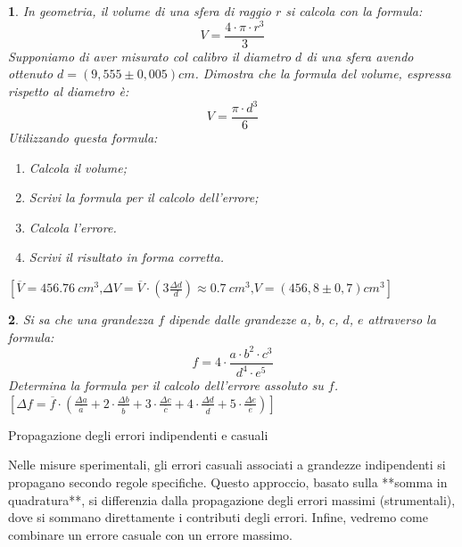 \documentclass[12pt,a4paper,oneside]{book}
\makeatletter
\renewcommand{\section}{\@startsection{section}{1}{\z@}
{-4ex \@plus -1ex \@minus -.4ex}
{1ex \@plus.2ex }
{\normalfont\large\sffamily\bfseries}}
\theoremstyle{esercizio}
\newtheorem{esercizio}{}
\makeatother
\begin{document}
\begin{esercizio}
In geometria, il volume di una sfera di raggio $r$ si calcola con la formula:
\[
V=\frac{4\cdot\pi \cdot r^3}{3}
\] 
Supponiamo di aver misurato col calibro il diametro $d$ di una sfera avendo ottenuto $d=\left(9,555 \pm 0,005\right)\si{cm}$. Dimostra che la formula del volume, espressa rispetto al diametro è:
\[
V=\frac{\pi \cdot d^3}{6}
\]
Utilizzando questa formula:
\begin{enumerate}
\item[a)] Calcola il volume;
\item[b)] Scrivi la formula per il calcolo dell'errore;
\item[c)] Calcola l'errore.
\item[d)] Scrivi il risultato in forma corretta.
\end{enumerate}
 \hspace*{\fill}   $\left[\overline{V}=\SI{456.76}{cm^3}\text{,} \Delta V=\overline{V}\cdot\left(3\frac{\Delta d}{d}\right)\approx\SI{0.7}{cm^3}\text{,} V=\left(456,8 \pm 0,7 \right)\si{cm^3}\right] $
\end{esercizio}
\vspace{0.2cm}
\begin{esercizio}
Si sa che una grandezza $f$ dipende dalle grandezze $a$, $b$, $c$, $d$, $e$ attraverso la formula:
\[
f = 4 \cdot \frac{a\cdot b^2 \cdot c^3}{d^4 \cdot e^5}
\]
Determina la formula per il calcolo dell'errore assoluto su $f$.\\

\hspace*{\fill} $\left[\Delta f=\overline{f}\cdot\left(\frac{\Delta a}{\overline{a}}+ 2\cdot \frac{\Delta b}{\overline{b}} +3\cdot\frac{\Delta c}{\overline{c}} + 4\cdot \frac{\Delta d}{\overline{d}} + 5\cdot \frac{\Delta e}{\overline{e}}  \right)\right]$
\end{esercizio}
\section{Propagazione degli errori indipendenti e casuali}

Nelle misure sperimentali, gli errori casuali associati a grandezze indipendenti si propagano secondo regole specifiche. Questo approccio, basato sulla **somma in quadratura**, si differenzia dalla propagazione degli errori massimi (strumentali), dove si sommano direttamente i contributi degli errori. Infine, vedremo come combinare un errore casuale con un errore massimo.
\end{document}
